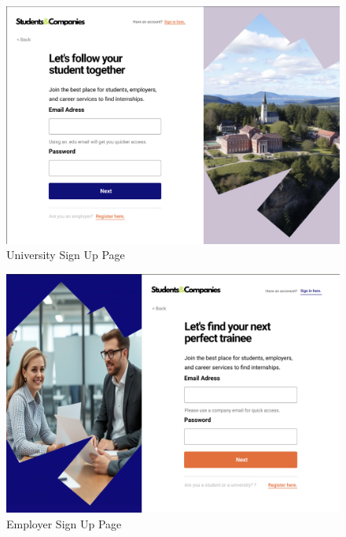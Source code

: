 \documentclass[a4paper,12pt]{article}
\begin{document}
\begin{figure}[H]
    \centering
    \includegraphics[scale = 0.45]{figures/UserInterfaces/General/UniversitySignUp.png}
    \caption{University Sign Up Page}
    \centering
\end{figure}
\begin{figure}[H]
    \centering
    \includegraphics[scale = 0.45]{figures/UserInterfaces/General/EmployerSignUp.png}
    \caption{Employer Sign Up Page}
    \centering
\end{figure}
\end{document}
